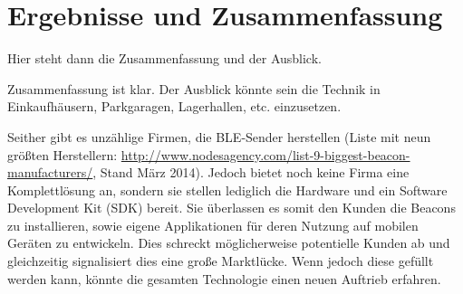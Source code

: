 \chapter{Ergebnisse und Zusammenfassung}
Hier steht dann die Zusammenfassung und der Ausblick.


Zusammenfassung ist klar. Der Ausblick könnte sein die Technik in Einkaufhäusern, Parkgaragen, Lagerhallen, etc. einzusetzen. 

Seither gibt es unzählige Firmen, die BLE-Sender herstellen (Liste mit neun größten Herstellern: \url{http://www.nodesagency.com/list-9-biggest-beacon-manufacturers/}, Stand März 2014). Jedoch bietet noch keine Firma eine Komplettlösung an, sondern sie stellen lediglich die Hardware und ein Software Development Kit (SDK) bereit. Sie überlassen es somit den Kunden die Beacons zu installieren, sowie eigene Applikationen für deren Nutzung auf mobilen Geräten zu entwickeln. Dies schreckt möglicherweise potentielle Kunden ab und gleichzeitig signalisiert dies eine große Marktlücke. Wenn jedoch diese gefüllt werden kann, könnte die gesamten Technologie einen neuen Auftrieb erfahren.

